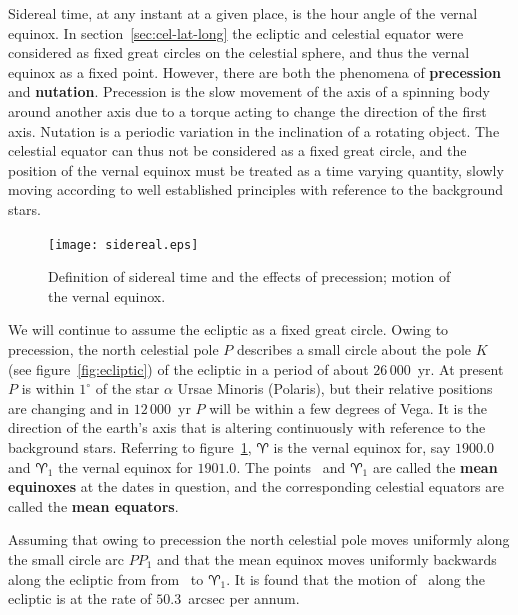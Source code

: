 Sidereal time, at any instant at a given place, is the hour angle of the vernal 
equinox. In section~\ref{sec:cel-lat-long} the ecliptic and celestial equator were 
considered as fixed great circles on the celestial sphere, and thus the vernal
equinox as a fixed point. However, there are both the phenomena of {\bf 
precession} and {\bf nutation}. Precession is the slow movement of the axis of a spinning body around another axis due to a torque acting to change the direction of the first axis.
Nutation is a periodic variation in the inclination of a rotating object. The celestial
equator can thus not be considered 
as a fixed great circle, and the position of the vernal equinox must be treated as
a time varying quantity, slowly moving according to well established principles with
reference to the background stars.

%
\begin{figure}[h]
	\centering
	\texttt{[image: sidereal.eps]}
	\caption{Definition of sidereal time and the effects of precession; motion 
		of the vernal equinox. }
	\label{fig:sidereal}
\end{figure}
%
We will continue to assume the ecliptic as a fixed great circle. Owing to precession, 
the north celestial pole $P$ describes a small circle about the pole $K$ (see 
figure~\ref{fig:ecliptic}) of the ecliptic in a period of about $26\,000$~yr. At 
present $P$ is within $1^\circ$ of the star $\alpha$ Ursae Minoris (Polaris), but 
their relative positions are changing and in $12\,000$~yr  $P$ will be within a few
degrees of Vega. It is the direction of the earth's axis that is altering continuously 
with reference to the background stars. Referring to figure~\ref{fig:sidereal},
$\aries$ is the vernal equinox for, say $1900.0$ and $\aries_1$ the vernal equinox
for $1901.0$. The points \aries\ and $\aries_1$
are called the {\bf mean equinoxes} at the dates
in question, and the corresponding celestial equators are called the 
{\bf mean equators}. 

Assuming that owing to precession the north celestial pole moves uniformly along the 
small circle arc $PP_1$ and that the mean equinox moves uniformly backwards along the 
ecliptic from from \aries\  to $\aries_1$. It is found that the motion of \aries\ along
the ecliptic is at the rate of $50.3$~arcsec per annum.

